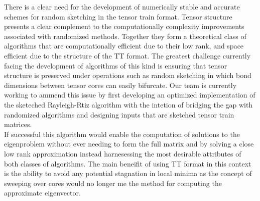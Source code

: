 \documentclass[%
 aip,12pt
 amsmath,amssymb,
 reprint,%
]{revtex4-1}
\begin{document}
There is a clear need for the development of numerically stable and accurate schemes for random sketching in the tensor train format. Tensor structure presents a clear complement to the computationally complexity improvements associated with randomized methods. Together they form a theoretical class of algorithms that are computationally efficient due to their low rank, and space efficient due to the structure of the TT format. The greatest challenge currently facing the development of algorithms of this kind is ensuring that tensor structure is preserved under operations such as random sketching in which bond dimensions between tensor cores can easily bifurcate. Our team is currently working to ammend this issue by first developing an optimized implementation of the sketeched Rayleigh-Rtiz algorithm with the intetion of bridging the gap with randomized algorithms and designing inputs that are sketched tensor train matrices.\\
If successful this algorithm would enable the computation of solutions to the eigenproblem without ever needing to form the full matrix and by solving a close low rank approximation instead harnesessing the most desirable attributes of both classes of algorithms. The main beneifit of using TT format in this context is the ability to avoid any potential stagnation in local minima as the concept of sweeping over cores would no longer me the method for computing the approximate eigenvector. 
\end{document}
